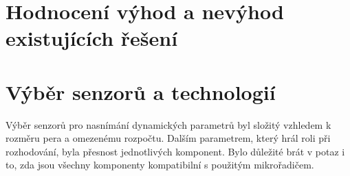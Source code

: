 \section{Hodnocení výhod a nevýhod existujících řešení}



\section{Výběr senzorů a technologií}
Výběr senzorů pro nasnímání dynamických parametrů byl složitý vzhledem k rozměru pera a omezenému rozpočtu. %
Dalším parametrem, který hrál roli při rozhodování, byla přesnost jednotlivých komponent.                   %
Bylo důležité brát v potaz i to, zda jsou všechny komponenty kompatibilní s použitým mikrořadičem.          %

